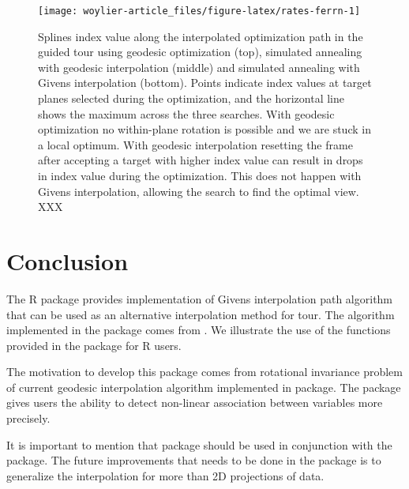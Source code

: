 \begin{Schunk}
\begin{figure}

{\centering \texttt{[image: woylier-article\_files/figure-latex/rates-ferrn-1]} 

}

\caption[Splines index value along the interpolated optimization path in the guided tour using geodesic optimization (top), simulated annealing with geodesic interpolation (middle) and simulated annealing with Givens interpolation (bottom)]{Splines index value along the interpolated optimization path in the guided tour using geodesic optimization (top), simulated annealing with geodesic interpolation (middle) and simulated annealing with Givens interpolation (bottom). Points indicate index values at target planes selected during the optimization, and the horizontal line shows the maximum across the three searches. With geodesic optimization no within-plane rotation is possible and we are stuck in a local optimum. With geodesic interpolation resetting the frame after accepting a target with higher index value can result in drops in index value during the optimization. This does not happen with Givens interpolation, allowing the search to find the optimal view.  XXX}\label{fig:rates-ferrn}
\end{figure}
\end{Schunk}

\hypertarget{conclusion}{%
\section{Conclusion}\label{conclusion}}

The R package  provides implementation of Givens
interpolation path algorithm that can be used as an alternative
interpolation method for tour. The algorithm implemented in the
 package comes from
\citet{buja_cook_asimov_hurley_2005}. We illustrate the use of the
functions provided in the package for R users.

The motivation to develop this package comes from rotational invariance
problem of current geodesic interpolation algorithm implemented in
 package. The package gives users the ability to detect
non-linear association between variables more precisely.

It is important to mention that  package should be used
in conjunction with the  package. The future improvements
that needs to be done in the package is to generalize the interpolation
for more than 2D projections of data.

